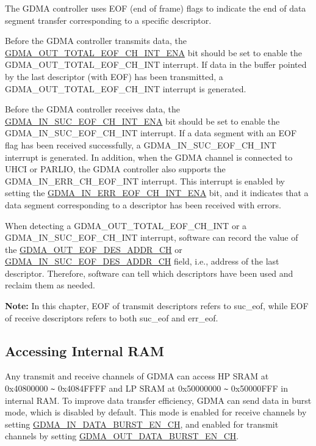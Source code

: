 \documentclass[main\_\_EN.tex]{subfiles}
\begin{document}
The GDMA controller uses EOF (end of frame) flags to indicate the end of data segment transfer corresponding to a specific descriptor.

Before the GDMA controller transmits data, the \hyperref[fielddesc:GDMAOUTTOTALEOFCHNINTENA]{GDMA\_OUT\_TOTAL\_EOF\_CH\_INT\_ENA} bit should be set to enable the GDMA\_OUT\_TOTAL\_EOF\_CH\_INT interrupt. If data in the buffer pointed by the last descriptor (with EOF) has been transmitted, a GDMA\_OUT\_TOTAL\_EOF\_CH\_INT interrupt is generated.

Before the GDMA controller receives data, the \hyperref[fielddesc:GDMAINSUCEOFCHNINTENA]{GDMA\_IN\_SUC\_EOF\_CH\_INT\_ENA} bit should be set to enable the GDMA\_IN\_SUC\_EOF\_CH\_INT interrupt. If a data segment with an EOF flag has been received successfully, a GDMA\_IN\_SUC\_EOF\_CH\_INT interrupt is generated. In addition, when the GDMA channel is connected to UHCI or PARLIO, the GDMA controller also supports the  GDMA\_IN\_ERR\_CH\_EOF\_INT interrupt. This interrupt is enabled by setting the \hyperref[fielddesc:GDMAINERREOFCHNINTENA]{GDMA\_IN\_ERR\_EOF\_CH\_INT\_ENA} bit, and it indicates that a data segment corresponding to a descriptor has been received with errors.

When detecting a GDMA\_OUT\_TOTAL\_EOF\_CH\_INT or a GDMA\_IN\_SUC\_EOF\_CH\_INT interrupt, software can record the value of the \hyperref[fielddesc:GDMAOUTEOFDESADDRCHN]{GDMA\_OUT\_EOF\_DES\_ADDR\_CH} or \hyperref[fielddesc:GDMAINSUCEOFDESADDRCHN]{GDMA\_IN\_SUC\_EOF\_DES\_ADDR\_CH} field, i.e., address of the last descriptor. Therefore, software can tell which descriptors have been used and reclaim them as needed.

{\bfseries Note: }In this chapter, EOF of transmit descriptors refers to suc\_eof, while EOF of receive descriptors refers to both suc\_eof and err\_eof.

\subsection{Accessing Internal RAM}\label{sec:dma-access-inter-ram}

Any transmit and receive channels of GDMA can access HP SRAM at 0x40800000 \verb+~+ 0x4084FFFF and LP SRAM at 0x50000000 \verb+~+ 0x50000FFF in internal RAM. To improve data transfer efficiency, GDMA can send data in burst mode, which is disabled by default. This mode is enabled for receive channels by setting \hyperref[fielddesc:GDMAINDATABURSTENCHN]{GDMA\_IN\_DATA\_BURST\_EN\_CH}, and enabled for transmit channels by setting \hyperref[fielddesc:GDMAOUTDATABURSTENCHN]{GDMA\_OUT\_DATA\_BURST\_EN\_CH}.
\end{document}
